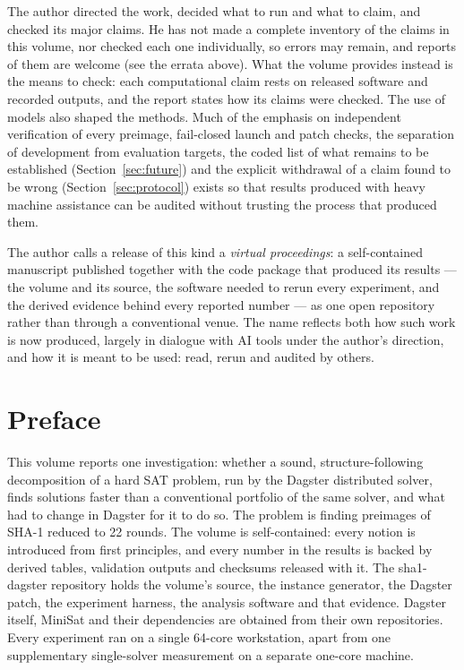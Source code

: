 \documentclass[11pt,a4paper]{article}
\begin{document}
The author directed the work, decided what to run and what to claim, and checked its major claims.
He has not made a complete inventory of the claims in this volume, nor checked each one individually,
so errors may remain, and reports of them are welcome (see the errata above). What the volume provides
instead is the means to check: each computational claim rests on released software and recorded
outputs, and the report states how its claims were checked. The use of models also shaped the
methods. Much of the emphasis on independent verification of every preimage, fail-closed launch and
patch checks, the separation of development from evaluation targets, the coded list of what remains to be
established (Section~\ref{sec:future}) and the explicit withdrawal of a claim found to be wrong
(Section~\ref{sec:protocol}) exists so
that results produced with heavy machine assistance can be audited without trusting the process that
produced them.

The author calls a release of this kind a \emph{virtual proceedings}: a self-contained manuscript
published together with the code package that produced its results --- the volume and its source,
the software needed to rerun every experiment, and the derived evidence behind every reported
number --- as one open repository rather than through a conventional venue. The name reflects both
how such work is now produced, largely in dialogue with AI tools under the author's direction, and
how it is meant to be used: read, rerun and audited by others.

\section*{Preface}

This volume reports one investigation: whether a sound, structure-following decomposition of a hard
SAT problem, run by the Dagster distributed solver, finds solutions faster than a conventional
portfolio of the same solver, and what had to change in Dagster for it to do so. The problem is
finding preimages of SHA-1 reduced to 22 rounds. The volume is self-contained: every notion is
introduced from first principles, and every number in the results is backed by derived tables,
validation outputs and checksums released with it. The sha1-dagster repository holds the volume's
source, the instance generator, the Dagster patch, the experiment harness, the analysis software and
that evidence. Dagster itself, MiniSat and their dependencies are obtained from their own
repositories. Every experiment ran on a single 64-core workstation, apart from one supplementary
single-solver measurement on a separate one-core machine.
\end{document}
